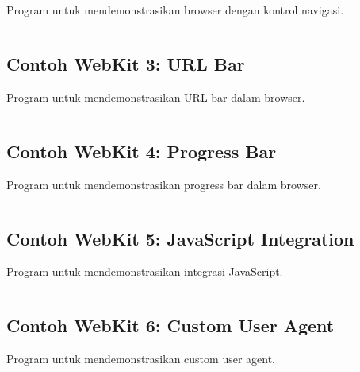 Program untuk mendemonstrasikan browser dengan kontrol navigasi.

\begin{lstlisting}[language=c++, caption=Browser dengan Kontrol]

\end{lstlisting}

\subsection{Contoh WebKit 3: URL Bar}

Program untuk mendemonstrasikan URL bar dalam browser.

\begin{lstlisting}[language=c++, caption=URL Bar]

\end{lstlisting}

\subsection{Contoh WebKit 4: Progress Bar}

Program untuk mendemonstrasikan progress bar dalam browser.

\begin{lstlisting}[language=c++, caption=Progress Bar]

\end{lstlisting}

\subsection{Contoh WebKit 5: JavaScript Integration}

Program untuk mendemonstrasikan integrasi JavaScript.

\begin{lstlisting}[language=c++, caption=JavaScript Integration]

\end{lstlisting}

\subsection{Contoh WebKit 6: Custom User Agent}

Program untuk mendemonstrasikan custom user agent.

\begin{lstlisting}[language=c++, caption=Custom User Agent]

\end{lstlisting}

